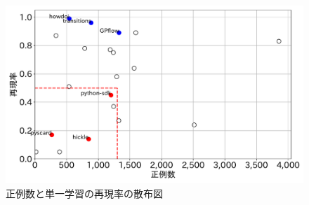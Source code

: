 \documentclass[submit]{ipsj}
\begin{document}






\begin{figure}[t]
	\centering
	\includegraphics[width=1\linewidth]{fig/sannpuzu.pdf}
	\caption{正例数と単一学習の再現率の散布図}
	\label{fig:scatter_plot_filtered}
\end{figure}
\end{document}
